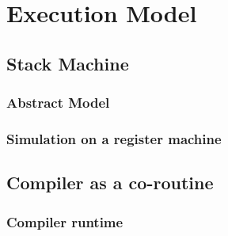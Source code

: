 \chapter{Execution Model}
\label{chap:Exec}

\section{Stack Machine}

\subsection{Abstract Model}

\subsection{Simulation on a register machine}

\section{Compiler as a co-routine}

\subsection{Compiler runtime}
